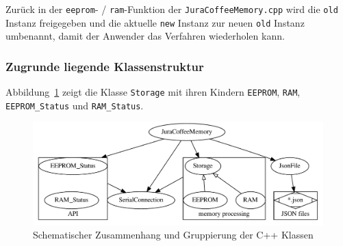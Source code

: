 Zurück in der \texttt{eeprom}- / \texttt{ram}-Funktion der \texttt{JuraCoffeeMemory.cpp} wird die \texttt{old} Instanz freigegeben und die aktuelle \texttt{new} Instanz zur neuen \texttt{old} Instanz umbenannt, damit der Anwender das Verfahren wiederholen kann.

\subsubsection{Zugrunde liegende Klassenstruktur}
Abbildung~\ref{fig:storage_inherit_graph} zeigt die Klasse \texttt{Storage} mit ihren Kindern \texttt{EEPROM}, \texttt{RAM}, \texttt{EEPROM\_Status} und \texttt{RAM\_Status}.

\begin{figure}
  \begin{center}
    \includegraphics[scale=0.65]{images/chapter_4/class-structure}
    \caption{Schematischer Zusammenhang und Gruppierung der C++ Klassen}
    \label{fig:storage_inherit_graph}
  \end{center}
\end{figure}







\todo



